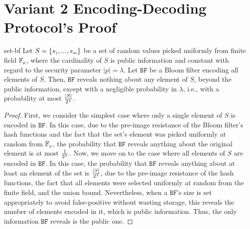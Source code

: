 
\section{Variant 2 Encoding-Decoding Protocol's Proof}\label{sec::Variant-2-Theorem-proof}

\begin{reptheorem}{set-bf}
Let  $S=\{s_{\scriptscriptstyle 1},..., s_{\scriptscriptstyle m}\}$ be a set of random values picked uniformly from finite field $\mathbb{F}_{\scriptscriptstyle p}$, where the cardinality of $S$ is public information and constant with regard to the security parameter $|p|=\lambda$. Let $\mathtt{BF}$ be a Bloom filter encoding all elements of   $S$. Then,  $\mathtt{BF}$ reveals nothing about any element of $S$, beyond the public information, except with a negligible probability in  $\lambda$, i.e., with a probability at most $\frac{|S|}{2^{\scriptscriptstyle \lambda}}$. 
\end{reptheorem}

\begin{proof}
First, we consider the simplest case where only a single element of $S$ is encoded in $\mathtt{BF}$. In this case, due to the pre-image resistance of the Bloom filter's hash functions and the fact that the set's element was picked uniformly at random from $\mathbb{F}_{\scriptscriptstyle p}$, the probability that $\mathtt{BF}$ reveals anything about the original element is at most $\frac{1}{2^{\scriptscriptstyle \lambda}}$. Now, we move on to the case where all elements of $S$ are encoded in $\mathtt{BF}$. In this case, the probability that $\mathtt{BF}$ reveals anything about at least an element of the set is $\frac{|S|}{2^{\scriptscriptstyle \lambda}}$, due to the pre-image resistance of the hash functions,  the fact that all elements were selected uniformly at random from the finite field, and the union bound. Nevertheless, when a $\mathtt{BF}$'s size is set appropriately to avoid false-positive without wasting storage, this reveals the number of elements encoded in it, which is public information.  Thus, the only information $\mathtt{BF}$ reveals is the public one.  
\end{proof}